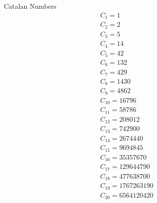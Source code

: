 \documentclass[12pt,reqno]{amsart}
\begin{document}
Catalan Numbers \\
\Huge
\begin{gather*}
C_{1} = 1\\
C_{2} = 2\\
C_{3} = 5\\
C_{4} = 14\\
C_{5} = 42\\
C_{6} = 132\\
C_{7} = 429\\
C_{8} = 1430\\
C_{9} = 4862\\
C_{10} = 16796\\
C_{11} = 58786\\
C_{12} = 208012\\
C_{13} = 742900\\
C_{14} = 2674440\\
C_{15} = 9694845\\
C_{16} = 35357670\\
C_{17} = 129644790\\
C_{18} = 477638700\\
C_{19} = 1767263190\\
C_{20} = 6564120420
\end{gather*}
\end{document}
